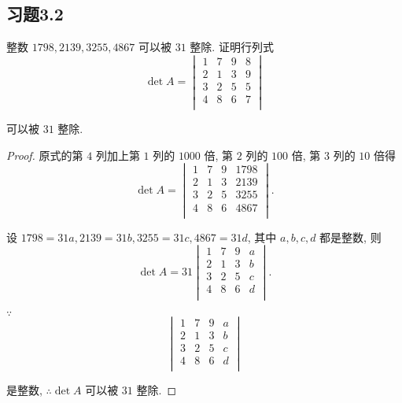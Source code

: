 \documentclass{ctexart}
\begin{document}
\subsection{习题3.2}
\begin{exercise}%
    整数 $1798,2139,3255,4867$ 可以被 $31$ 整除. 证明行列式
    \[\det A=\begin{vmatrix}
        1 & 7 & 9 & 8 \\
        2 & 1 & 3 & 9 \\
        3 & 2 & 5 & 5 \\
        4 & 8 & 6 & 7 \\
    \end{vmatrix}\]

    可以被 $31$ 整除.
\end{exercise}
\begin{proof}
    原式的第 $4$ 列加上第 $1$ 列的 $1000$ 倍, 第 $2$ 列的 $100$ 倍, 第 $3$ 列的 $10$ 倍得
    \[\det A=\begin{vmatrix}
        1 & 7 & 9 & 1798 \\
        2 & 1 & 3 & 2139 \\
        3 & 2 & 5 & 3255 \\
        4 & 8 & 6 & 4867 \\
    \end{vmatrix}.\]

    设 $1798=31a,2139=31b,3255=31c,4867=31d$, 其中 $a,b,c,d$ 都是整数, 则
    \[\det A=31\begin{vmatrix}
        1 & 7 & 9 & a \\
        2 & 1 & 3 & b \\
        3 & 2 & 5 & c \\
        4 & 8 & 6 & d \\
    \end{vmatrix}.\]

    $\because$
    \[\begin{vmatrix}
        1 & 7 & 9 & a \\
        2 & 1 & 3 & b \\
        3 & 2 & 5 & c \\
        4 & 8 & 6 & d \\
    \end{vmatrix}\]

    是整数, $\therefore\det A$ 可以被 $31$ 整除.
\end{proof}
\end{document}
